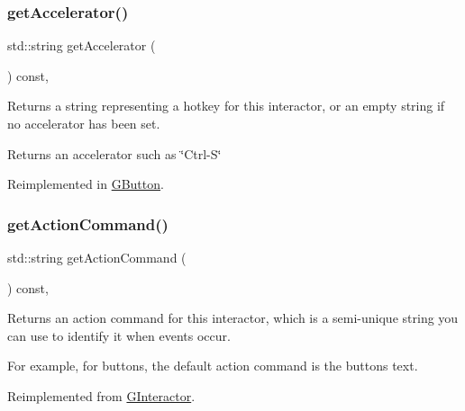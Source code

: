 \subsubsection{\texorpdfstring{get\+Accelerator()}{getAccelerator()}}
{\footnotesize\ttfamily std\+::string get\+Accelerator (\begin{DoxyParamCaption}{ }\end{DoxyParamCaption}) const\hspace{0.3cm}{\ttfamily [virtual]}, {\ttfamily [inherited]}}



Returns a string representing a hotkey for this interactor, or an empty string if no accelerator has been set. 

\begin{DoxyReturn}{Returns}
an accelerator such as \char`\"{}\+Ctrl-\/\+S\char`\"{} 
\end{DoxyReturn}


Reimplemented in \mbox{\hyperlink{classGButton_a57806dc9defb73f76f493f8548319924}{G\+Button}}.

\mbox{\label{classGCheckBox_a4f83505141da1f8446f0e0e0a9507930}} 
\subsubsection{\texorpdfstring{get\+Action\+Command()}{getActionCommand()}}
{\footnotesize\ttfamily std\+::string get\+Action\+Command (\begin{DoxyParamCaption}{ }\end{DoxyParamCaption}) const\hspace{0.3cm}{\ttfamily [override]}, {\ttfamily [virtual]}}



Returns an action command for this interactor, which is a semi-\/unique string you can use to identify it when events occur. 

For example, for buttons, the default action command is the button\textquotesingle{}s text. 

Reimplemented from \mbox{\hyperlink{classGInteractor_a94eb4276000c4fdfb508ce9e6317a82a}{G\+Interactor}}.

\mbox{\label{classGInteractor_a808e22cc1fdfbecf71ed8c64ef4600e0}} 
